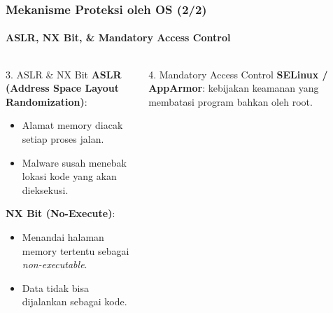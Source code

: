 \documentclass[t,aspectratio=169,xcolor=dvipsnames]{beamer}
\begin{document}
\begin{frame}[shrink=5]
    \frametitle{Mekanisme Proteksi oleh OS (2/2)}
    \framesubtitle{ASLR, NX Bit, \& Mandatory Access Control}

    \begin{columns}[T]
        \begin{block}{3. ASLR \& NX Bit}
            \small
            \textbf{ASLR (Address Space Layout Randomization)}:
            \begin{itemize}
                \item Alamat memory diacak setiap proses jalan.
                \item Malware susah menebak lokasi kode yang akan dieksekusi.
            \end{itemize}
            \vspace{0.05cm}
            \textbf{NX Bit (No-Execute)}:
            \begin{itemize}
                \item Menandai halaman memory tertentu sebagai \textit{non-executable}.
                \item Data tidak bisa dijalankan sebagai kode.
            \end{itemize}
        \end{block}

        \begin{block}{4. Mandatory Access Control}
            \small
            \textbf{SELinux / AppArmor}: kebijakan keamanan yang membatasi program bahkan oleh root.
        \end{block}
    \end{columns}
\end{frame}
\end{document}
